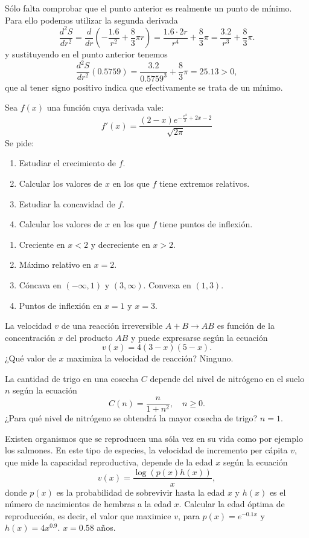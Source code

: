 {Sólo falta comprobar que el punto anterior es realmente un punto de mínimo. Para ello podemos utilizar la segunda derivada
\[
\frac{d^2S}{dr^2} = \frac{d}{dr}\left(-\frac{1.6}{r^2}+\frac{8}{3}\pi r\right) = \frac{1.6\cdot 2r}{r^4}+\frac{8}{3}\pi = \frac{3.2}{r^3}+\frac{8}{3}\pi.
\]
y sustituyendo en el punto anterior tenemos
\[
\frac{d^2S}{dr^2}(0.5759) =  \frac{3.2}{0.5759^3}+\frac{8}{3}\pi = 25.13 >0,
\]
que al tener signo positivo indica que efectivamente se trata de un mínimo.
}

{Sea $f(x)$ una función cuya derivada vale:
\[
f'(x) = \frac{(2-x) e^{-\frac{x^2}{2}+2x-2}}{\sqrt{2\pi}}
\]
Se pide:
\begin{enumerate}
\item Estudiar el crecimiento de $f$.
\item Calcular los valores de $x$ en los que $f$ tiene extremos relativos.
\item Estudiar la concavidad de $f$.
\item Calcular los valores de $x$ en los que $f$ tiene puntos de inflexión.
\end{enumerate}
}
{\begin{enumerate}
\item Creciente en $x<2$ y decreciente en $x>2$.
\item Máximo relativo en $x=2$.
\item Cóncava en $(-\infty,1)$ y $(3,\infty)$. Convexa en $(1,3)$.
\item Puntos de inflexión en $x=1$ y $x=3$.
\end{enumerate}
}
{
}


{La velocidad $v$ de una reacción irreversible $A+B\rightarrow AB$ es función de la concentración $x$ del producto $AB$ y puede expresarse según la ecuación
\[
v(x) = 4(3-x)(5-x).
\]
¿Qué valor de $x$ maximiza la velocidad de reacción?
}
{Ninguno.
}
{
}


{La cantidad de trigo en una cosecha $C$ depende del nivel de nitrógeno en el suelo $n$ según la ecuación
\[
C(n) = \frac{n}{1+n^2},\quad n\geq 0.
\]
¿Para qué nivel de nitrógeno se obtendrá la mayor cosecha de trigo?
}
{$n=1$.
}
{
}


{Existen organismos que se reproducen una sóla vez en su vida como por ejemplo los salmones.
En este tipo de especies, la velocidad de incremento per cápita $v$, que mide la capacidad reproductiva, depende de la edad $x$ según la ecuación
\[
v(x) = \frac{\log(p(x)h(x))}{x},
\]
donde $p(x)$ es la probabilidad de sobrevivir hasta la edad $x$ y $h(x)$ es el número de nacimientos de hembras a la edad $x$.
Calcular la edad óptima de reproducción, es decir, el valor que maximice $v$, para $p(x)=e^{-0.1x}$ y $h(x)=4x^{0.9}$.}
{$x=0.58$ años.
}
{
}


